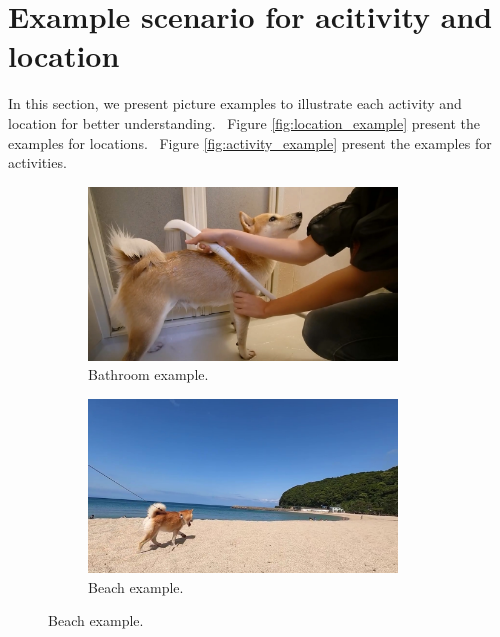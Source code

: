 \documentclass[letterpaper]{article}
\newcommand{\figref}[1]{Figure \ref{#1}}
\begin{document}
\section{Example scenario for acitivity and location}
In this section, we present picture examples to illustrate each activity and location for better understanding. ~\figref{fig:location_example} present the examples for locations. ~\figref{fig:activity_example} present the examples for activities. 

\begin{figure}[h]
\centering
\begin{subfigure}[]{0.4\textwidth}
	\centering
	\includegraphics[width=0.9\textwidth]{images/bathroom.jpg}
	\caption{Bathroom example.}
	\label{fig:loc1}
\end{subfigure}
\begin{subfigure}[]{0.4\textwidth}
	\centering
	\includegraphics[width=0.9\textwidth]{images/beach.jpg}
	\caption{Beach example.}
	\label{fig:loc2}
\end{subfigure}


\end{figure}
\end{document}
